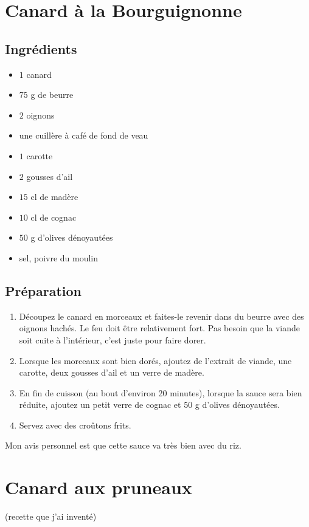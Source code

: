 \newpage
\section{Canard à la Bourguignonne}

\subsection*{Ingrédients}
\begin{itemize}
\item $1$ canard
\item $75$ g de beurre
\item $2$ oignons
\item une cuillère à café de fond de veau
\item $1$ carotte
\item $2$ gousses d'ail
\item $15$ cl de madère
\item $10$ cl de cognac
\item $50$ g d'olives dénoyautées
\item sel, poivre du moulin
\end{itemize}

\subsection*{Préparation}
\begin{enumerate}
\item Découpez le canard en morceaux et faites-le revenir dans du beurre avec des oignons hachés. Le feu doit être relativement fort. Pas besoin que la viande soit cuite à l'intérieur, c'est juste pour faire dorer.
\item Lorsque les morceaux sont bien dorés, ajoutez de l'extrait de viande, une carotte, deux gousses d'ail et un verre de madère.
\item En fin de cuisson (au bout d'environ 20 minutes), lorsque la sauce sera bien réduite, ajoutez un petit verre de cognac et 50 g d'olives dénoyautées.
\item Servez avec des croûtons frits.
\end{enumerate}

\begin{remarque}
Mon avis personnel est que cette sauce va très bien avec du riz.
\end{remarque}

\newpage
\section{Canard aux pruneaux}
(recette que j'ai inventé)

